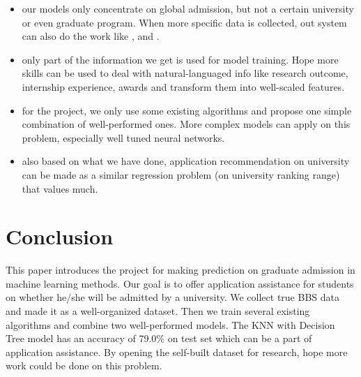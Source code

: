 \documentclass{article}
\begin{document}
\begin{itemize}
    \item our models only concentrate on global admission, but not a certain university or even graduate program. When more specific data is collected, out system can also do the work like \cite{bruggink1996statistical}, \cite{gupta2016will} and \cite{moore1998expert}.
    \item only part of the information we get is used for model training. Hope more skills can be used to deal with natural-languaged info like research outcome, internship experience, awards and transform them into well-scaled features.
    \item for the project, we only use some existing algorithms and propose one simple combination of well-performed ones. More complex models can apply on this problem, especially well tuned neural networks.
    \item also based on what we have done, application recommendation on university can be made as a similar regression problem (on university ranking range) that values much.
\end{itemize}

\section{Conclusion}

This paper introduces the project for making prediction on graduate admission in machine learning methods. Our goal is to offer application assistance for students on whether he/she will be admitted by a university. We collect true BBS data and made it as a well-organized dataset. Then we train several existing algorithms and combine two well-performed models. The KNN with Decision Tree model has an accuracy of 79.0\% on test set which can be a part of application assistance. By opening the self-built dataset for research, hope more work could be done on this problem.



\end{document}
